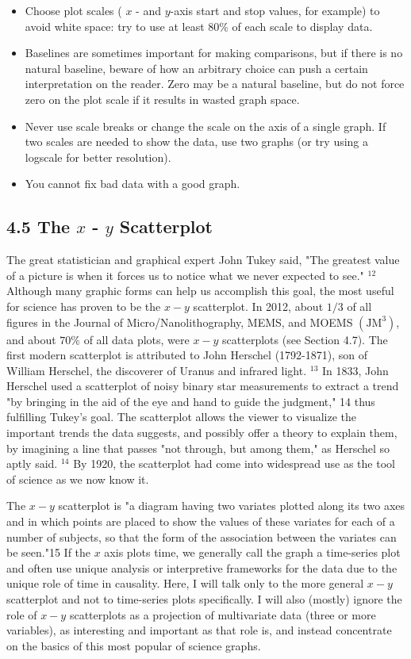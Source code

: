 \begin{itemize}
  \item Choose plot scales ( $x$ - and $y$-axis start and stop values, for example) to avoid white space: try to use at least $80 \%$ of each scale to display data.
  \item Baselines are sometimes important for making comparisons, but if there is no natural baseline, beware of how an arbitrary choice can push a certain interpretation on the reader. Zero may be a natural baseline, but do not force zero on the plot scale if it results in wasted graph space.
  \item Never use scale breaks or change the scale on the axis of a single graph. If two scales are needed to show the data, use two graphs (or try using a logscale for better resolution).
  \item You cannot fix bad data with a good graph.
\end{itemize}

\subsection*{4.5 The $x$ - $y$ Scatterplot}
The great statistician and graphical expert John Tukey said, "The greatest value of a picture is when it forces us to notice what we never expected to see." ${ }^{12}$ Although many graphic forms can help us accomplish this goal, the most useful for science has proven to be the $x-y$ scatterplot. In 2012, about $1 / 3$ of all figures in the Journal of Micro/Nanolithography, MEMS, and MOEMS $\left(\mathrm{JM}^{3}\right)$, and about $70 \%$ of all data plots, were $x-y$ scatterplots (see Section 4.7). The first modern scatterplot is attributed to John Herschel (1792-1871), son of William Herschel, the discoverer of Uranus and infrared light. ${ }^{13}$ In 1833, John Herschel used a scatterplot of noisy binary star measurements to extract a trend "by bringing in the aid of the eye and hand to guide the judgment," 14 thus fulfilling Tukey's goal. The scatterplot allows the viewer to visualize the important trends the data suggests, and possibly offer a theory to explain them, by imagining a line that passes "not through, but among them," as Herschel so aptly said. ${ }^{14}$ By 1920, the scatterplot had come into widespread use as the tool of science as we now know it.

The $x-y$ scatterplot is "a diagram having two variates plotted along its two axes and in which points are placed to show the values of these variates for each of a number of subjects, so that the form of the association between the variates can be seen."15 If the $x$ axis plots time, we generally call the graph a time-series plot and often use unique analysis or interpretive frameworks for the data due to the unique role of time in causality. Here, I will talk only to the more general $x-y$ scatterplot and not to time-series plots specifically. I will also (mostly) ignore the role of $x-y$ scatterplots as a projection of multivariate data (three or more variables), as interesting and important as that role is, and instead concentrate on the basics of this most popular of science graphs.

